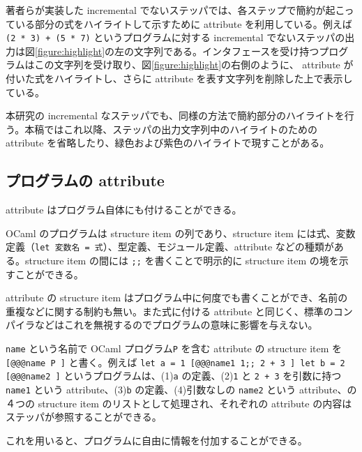 著者らが実装した incremental でないステッパ\cite{FCA19}では、各ステップで簡約が起こっている部分の式をハイライトして示すために attribute を利用している。例えば \texttt{(2 * 3) + (5 * 7)} というプログラムに対する incremental でないステッパの出力は図\ref{figure:highlight}の左の文字列である。インタフェースを受け持つプログラムはこの文字列を受け取り、図\ref{figure:highlight}の右側のように、 attribute が付いた式をハイライトし、さらに attribute を表す文字列を削除した上で表示している。

本研究の incremental なステッパでも、同様の方法で簡約部分のハイライトを行う。本稿ではこれ以降、ステッパの出力文字列中のハイライトのための attribute を省略したり、緑色および紫色のハイライトで現すことがある。

\subsection{プログラムの attribute}
\label{OCamlのattribute-プログラムのattribute}
attribute はプログラム自体にも付けることができる。

OCaml のプログラムは structure item の列であり、structure item には式、変数定義（\texttt{let 変数名 = 式}）、型定義、モジュール定義、attribute などの種類がある。structure item の間には \texttt{;;} を書くことで明示的に structure item の境を示すことができる。

attribute の structure item はプログラム中に何度でも書くことができ、名前の重複などに関する制約も無い。また式に付ける attribute と同じく、標準のコンパイラなどはこれを無視するのでプログラムの意味に影響を与えない。

\texttt{name} という名前で OCaml プログラム\texttt{P} を含む attribute の structure item を \texttt{[@@@name P ]} と書く。例えば \texttt{let a = 1 [@@@name1 1;; 2 + 3 ] let b = 2 [@@@name2 ]} というプログラムは、(1)\texttt{a} の定義、(2)\texttt{1} と \texttt{2 + 3} を引数に持つ \texttt{name1} という attribute、(3)\texttt{b} の定義、(4)引数なしの \texttt{name2} という attribute、の４つの structure item のリストとして処理され、それぞれの attribute の内容はステッパが参照することができる。

これを用いると、プログラムに自由に情報を付加することができる。
